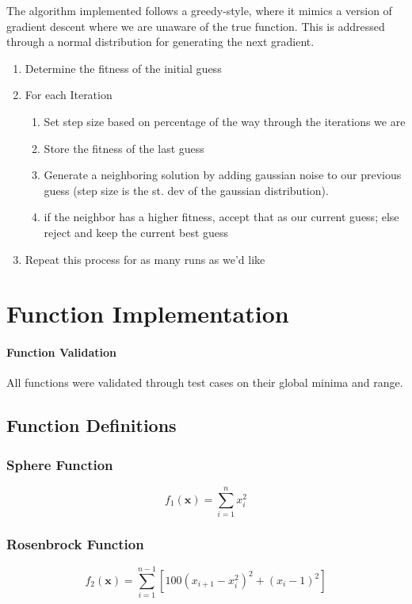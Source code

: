 \documentclass{article}
\begin{document}
The algorithm implemented follows a greedy-style, where it mimics a version of gradient descent where we are unaware of the true function. This is addressed through a normal distribution for generating the next gradient.

\begin{enumerate}
    \item Determine the fitness of the initial guess 
    \item For each Iteration
        \begin{enumerate}
            \item Set step size based on percentage of the way through the iterations we are
            \item Store the fitness of the last guess 
            \item Generate a neighboring solution by adding gaussian noise to our previous guess (step size is the st. dev of the gaussian distribution).
            \item if the neighbor has a higher fitness, accept that as our current guess; else reject and keep the current best guess
        \end{enumerate}
    \item Repeat this process for as many runs as we'd like
\end{enumerate}

\section{Function Implementation}

\paragraph{Function Validation} All functions were validated through test cases on their global minima and range.

\subsection{Function Definitions}
\subsubsection{Sphere Function}
$$f_1(\mathbf{x}) = \sum_{i=1}^{n} x_i^2$$

\subsubsection{Rosenbrock Function}
$$f_2(\mathbf{x}) = \sum_{i=1}^{n-1} \left[100(x_{i+1} - x_i^2)^2 + (x_i - 1)^2\right]$$
\end{document}

